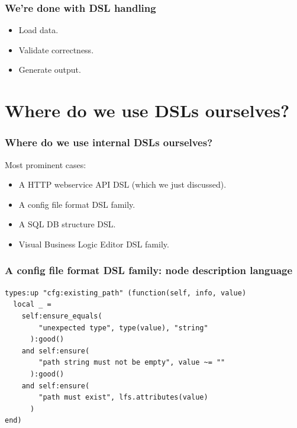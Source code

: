 \documentclass[handout]{beamer}
\begin{document}

\begin{frame}

\frametitle{We're done with DSL handling}

\begin{itemize}
\item[\checkmark] Load data.
\item[\checkmark] Validate correctness.
\item[\checkmark] Generate output.
\end{itemize}

\end{frame}


\section{Where do we use DSLs ourselves?}


\begin{frame}

\frametitle{Where do we use internal DSLs ourselves?}

Most prominent cases:

\begin{itemize}
\item A HTTP webservice API DSL (which we just discussed).
\item A config file format DSL family.
\item A SQL DB structure DSL.
\item Visual Business Logic Editor DSL family.
\end{itemize}

\end{frame}


\begin{frame}[fragile]

\frametitle{A config file format DSL family: node description language}

\begin{verbatim}
types:up "cfg:existing_path" (function(self, info, value)
  local _ =
    self:ensure_equals(
        "unexpected type", type(value), "string"
      ):good()
    and self:ensure(
        "path string must not be empty", value ~= ""
      ):good()
    and self:ensure(
        "path must exist", lfs.attributes(value)
      )
end)
\end{verbatim}

\end{frame}
\end{document}
